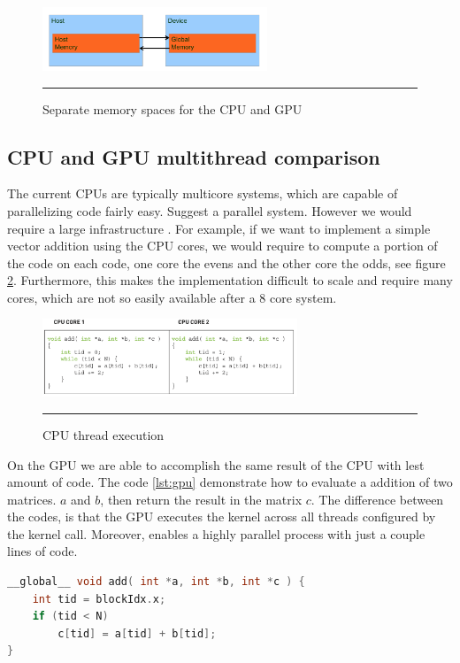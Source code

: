 \begin{figure}[htbp]
	\centering
		\includegraphics[width=0.6\textwidth]{Figures/memorySpace.png}
		\rule{35em}{0.5pt}
	\caption[Memory Space GPU and CPU]{Separate memory spaces for the CPU and GPU}
	\label{fig:memorySpace}
\end{figure}

\subsection{CPU and GPU multithread comparison}

The current CPUs are typically multicore systems, which are capable of parallelizing code fairly easy. Suggest a parallel system. However we would require a large infrastructure  \cite{example}. For example, if we want to implement a simple vector addition using the CPU cores, we would require to compute a portion of the code on each code, one core the evens and the other core the odds, see figure \ref{fig:cpu}. Furthermore, this makes the implementation difficult to scale and require many cores, which are not so easily available after a 8 core system. 

\begin{figure}[htbp]
	\centering
		\includegraphics[width=0.68\textwidth]{Figures/cpu.png}
		\rule{35em}{0.5pt}
	\caption[CPU Thread execution]{CPU thread execution}
	\label{fig:cpu}
\end{figure}


On the GPU we are able to accomplish the same result of the CPU with lest amount of code. The code \ref{lst:gpu} demonstrate how to evaluate a addition of two matrices. $a$ and $b$, then return the result in the matrix $c$. The difference between the codes, is that the GPU executes the kernel across all threads configured by the kernel call. Moreover, enables a highly parallel process with just a couple lines of code. 

\begin{lstlisting}[language=C++, label={lst:gpu}, caption={GPU parallel capabilities}]
__global__ void add( int *a, int *b, int *c ) {
	int tid = blockIdx.x;
	if (tid < N)
		c[tid] = a[tid] + b[tid];
}
\end{lstlisting}

